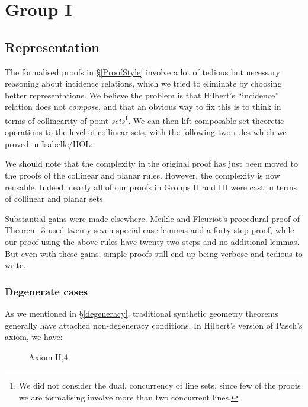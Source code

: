 \chapter{Group I}\label{chapter:Group1}
\section{Representation}\label{Verbosity}
The formalised proofs in \S \ref{ProofStyle} involve a lot of tedious but necessary reasoning about incidence relations, which we tried to eliminate by choosing better representations. We believe the problem is that Hilbert's ``incidence'' relation does not \emph{compose}, and that an obvious way to fix this is to think in terms of collinearity of point \emph{sets}\footnote{We did not consider the dual, concurrency of line sets, since few of the proofs we are formalising involve more than two concurrent lines.}. We can then lift composable set-theoretic operations to the level of collinear sets, with the following two rules which we proved in Isabelle/HOL:

We should note that the complexity in the original proof has just been moved to the proofs of the collinear and planar rules. However, the complexity is now reusable. Indeed, nearly all of our proofs in Groups II and III were cast in terms of collinear and planar sets. 

Substantial gains were made elsewhere. Meikle and Fleuriot's procedural proof of Theorem~3 used twenty-seven special case lemmas and a forty step proof, while our proof using the above rules have twenty-two steps and no additional lemmas. But even with these gains, simple proofs still end up being verbose and tedious to write.

\subsection{Degenerate cases}
As we mentioned in \S\ref{degeneracy}, traditional synthetic geometry theorems generally have attached non-degeneracy conditions. In Hilbert's version of Pasch's axiom, we have:

\begin{figure}\label{PaschDiagram}
\caption{Axiom II,4}
\end{figure}

